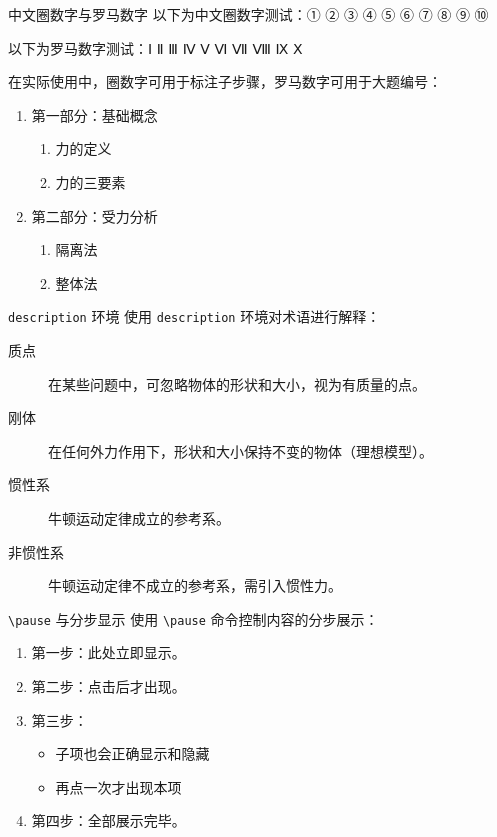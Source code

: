 \documentclass[darkmode=false, randomquote=true, quoteseed=2026, shownav=false,handout=false]{HiBeamer}
\begin{document}
\begin{frame}{中文圈数字与罗马数字}
  以下为中文圈数字测试：① ② ③ ④ ⑤ ⑥ ⑦ ⑧ ⑨ ⑩

  \vspace{0.5em}
  以下为罗马数字测试：Ⅰ \; Ⅱ  \; Ⅲ   \; Ⅳ  \; Ⅴ  \; Ⅵ  \; Ⅶ  \; Ⅷ  \; Ⅸ  \; Ⅹ

  \vspace{1em}
  在实际使用中，圈数字可用于标注子步骤，罗马数字可用于大题编号：

  \begin{enumerate}
    \item[Ⅰ.] 第一部分：基础概念
    \begin{enumerate}
      \item[①] 力的定义
      \item[②] 力的三要素
    \end{enumerate}
    \item[Ⅱ.] 第二部分：受力分析
    \begin{enumerate}
      \item[①] 隔离法
      \item[②] 整体法
    \end{enumerate}
  \end{enumerate}
\end{frame}

\begin{frame}{\texttt{description} 环境}
  使用 \texttt{description} 环境对术语进行解释：

  \begin{description}
    \item[质点] 在某些问题中，可忽略物体的形状和大小，视为有质量的点。
    \item[刚体] 在任何外力作用下，形状和大小保持不变的物体（理想模型）。
    \item[惯性系] 牛顿运动定律成立的参考系。
    \item[非惯性系] 牛顿运动定律不成立的参考系，需引入惯性力。
  \end{description}
\end{frame}

\begin{frame}{\texttt{\textbackslash pause} 与分步显示}
  使用 \texttt{\textbackslash pause} 命令控制内容的分步展示：

  \begin{enumerate}
    \item 第一步：此处立即显示。
    \pause
    \item 第二步：点击后才出现。
    \pause
    \item 第三步：
    \begin{itemize}
      \item 子项也会正确显示和隐藏
      \pause
      \item 再点一次才出现本项
    \end{itemize}
    \pause
    \item 第四步：全部展示完毕。
  \end{enumerate}
\end{frame}
\end{document}
